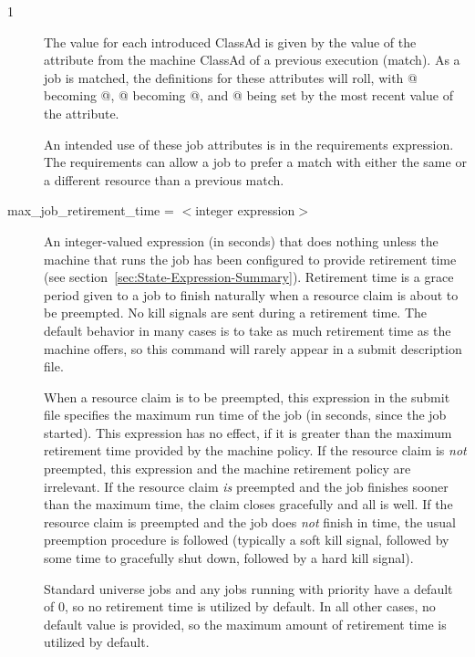 \begin{ManPage}{\label{man-condor-submit}}{1}
\begin{description}
The value for each introduced ClassAd is given by the
value of the  attribute
from the machine ClassAd of a previous execution (match).
As a job is matched, the definitions for these attributes
will roll,
with @ becoming @,
@ becoming @,
and @ being set by the most recent
value of the  attribute.

An intended use of
these job attributes is in the requirements expression.
The requirements can allow a job to prefer a match with either the same
or a different resource than a previous match.



\item[max\_job\_retirement\_time = $<$integer expression$>$]
An integer-valued expression (in seconds) that
does nothing unless the machine that runs the job has been configured
to provide retirement time
(see section~\ref{sec:State-Expression-Summary}).
Retirement time is a
grace period given to a job to finish naturally
when a resource claim is about to be preempted.
No kill signals are sent during a retirement time.
The default behavior in many cases is to take as much
retirement time as the machine offers,
so this command will rarely appear in a submit description file.

When a resource claim is to be preempted, this expression in the
submit file specifies the maximum run time of the job (in seconds, since
the job started).
This expression has no effect,
if it is greater than the maximum retirement time provided
by the machine policy.
If the resource claim is \emph{not} preempted,
this expression and the machine retirement policy are irrelevant. 
If the resource claim \emph{is} preempted
and the job finishes sooner than the maximum time,
the claim closes gracefully and all is well.
If the resource claim is preempted
and the job does \emph{not} finish in time,
the usual preemption
procedure is followed (typically a soft kill signal, followed by some
time to gracefully shut down, followed by a hard kill signal).

Standard universe jobs and any jobs running with 
priority have a default  of 0,
so no retirement time is utilized by default.
In all other cases,
no default value is provided,
so the maximum amount of retirement time is utilized by default.


\end{description}
\end{ManPage}
